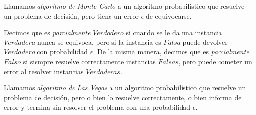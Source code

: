 \begin{definition}
	Llamamos \textit{algoritmo de Monte Carlo} a un algoritmo probabilístico que resuelve un problema de decisión, pero tiene un error $\epsilon$ de equivocarse.
	
	Decimos que es \textit{parcialmente} $Verdadero$ si cuando se le da una instancia $Verdadera$ nunca se equivoca, pero si la instancia es $Falsa$ puede devolver $Verdadero$ con probabilidad $\epsilon$. De la misma manera, decimos que es \textit{parcialmente} $Falso$ si siempre resuelve correctamente instancias $Falsas$, pero puede cometer un error al resolver instancias $Verdaderas$.
\end{definition}


\begin{definition}
	Llamamos \textit{algoritmo de Las Vegas} a un algoritmo probabilístico que resuelve un problema de decisión, pero o bien lo resuelve correctamente, o bien informa de error y termina sin resolver el problema con una probabilidad $\epsilon$.
\end{definition}



